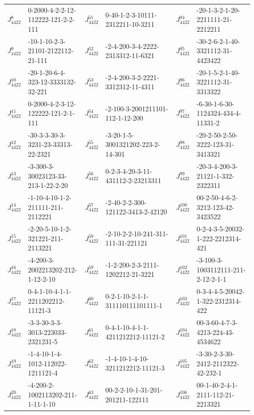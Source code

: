 \begin{table}[t]
\begin{tabular}{l l l l l l}
 $J^{8}_{4422}$&0-2000-4-2-2-12-112222-121-2-2-111&\hphantom{}$J^{51}_{4422}$&0-40-1-2-3-10111-2312211-10-3211&\hphantom{}$J^{94}_{4422}$&-20-1-3-2-1-20-2211111-21-2212211\\
 $J^{9}_{4422}$&-10-1-10-2-3-21101-2122112-21-111&\hphantom{}$J^{52}_{4422}$&-2-4-200-3-4-2222-2313312-11-6321&\hphantom{}$J^{95}_{4422}$&-30-2-6-2-1-40-3321112-31-4423422\\
 $J^{10}_{4422}$&-20-1-20-6-4-323-12-3333132-32-221&\hphantom{}$J^{53}_{4422}$&-2-4-200-3-2-2221-3312312-11-4311&\hphantom{}$J^{96}_{4422}$&-20-1-5-2-1-40-3221112-31-3313322\\
 $J^{11}_{4422}$&0-2000-4-2-3-12-122222-121-2-1-111&\hphantom{}$J^{54}_{4422}$&-2-100-3-2001211101-112-1-12-200&\hphantom{}$J^{97}_{4422}$&-6-30-1-6-30-1124324-434-4-11331-2\\
 $J^{12}_{4422}$&-30-3-3-30-3-3231-23-33313-22-2321&\hphantom{}$J^{55}_{4422}$&-3-20-1-5-3001321202-223-2-14-301&\hphantom{}$J^{98}_{4422}$&-20-2-50-2-50-3222-123-31-3413321\\
 $J^{13}_{4422}$&-3-300-3-30023123-33-213-1-22-2-20&\hphantom{}$J^{56}_{4422}$&0-2-3-4-20-3-11-431112-2-23213311&\hphantom{}$J^{99}_{4422}$&-20-3-4-200-3-21121-1-332-2322311\\
 $J^{14}_{4422}$&-1-10-4-10-1-2-211111-211-2112221&\hphantom{}$J^{57}_{4422}$&-2-40-2-2-300-121122-3413-2-42120&\hphantom{}$J^{100}_{4422}$&00-2-50-4-6-2-3212-123-42-3423522\\
 $J^{15}_{4422}$&-2-20-5-10-1-2-321221-211-2113221&\hphantom{}$J^{58}_{4422}$&-2-10-2-2-10-241-311-111-31-221121&\hphantom{}$J^{101}_{4422}$&0-2-4-3-5-20032-1-222-2212314-421\\
 $J^{16}_{4422}$&-4-200-3-2002213202-212-1-12-2-10&\hphantom{}$J^{59}_{4422}$&-1-2-200-2-3-2111-1202212-21-3221&\hphantom{}$J^{102}_{4422}$&-3-100-3-1003112111-211-2-12-2-1-1\\
 $J^{17}_{4422}$&0-4-1-10-4-1-1-2211202212-11121-3&\hphantom{}$J^{60}_{4422}$&0-2-1-10-2-1-1-311110111101111-1&\hphantom{}$J^{103}_{4422}$&0-3-4-4-5-20042-1-322-2312314-422\\
 $J^{18}_{4422}$&-3-3-30-3-3-3013-223033-2321231-5&\hphantom{}$J^{61}_{4422}$&0-4-1-10-4-1-1-4211212212-11121-2&\hphantom{}$J^{104}_{4422}$&00-3-60-4-7-3-4213-224-43-4534622\\
 $J^{19}_{4422}$&-1-4-10-1-4-1012-112022-1211121-4&\hphantom{}$J^{62}_{4422}$&-1-4-10-1-4-10-3211212212-11121-3&\hphantom{}$J^{105}_{4422}$&-3-30-2-3-30-2412-2112322-42-232-1\\
 $J^{20}_{4422}$&-4-200-2-1002113202-211-1-11-1-10&\hphantom{}$J^{63}_{4422}$&00-2-2-10-1-31-201-201211-122111&\hphantom{}$J^{106}_{4422}$&00-1-40-2-4-1-2111-112-21-2213321\\

\end{tabular}
\end{table}
